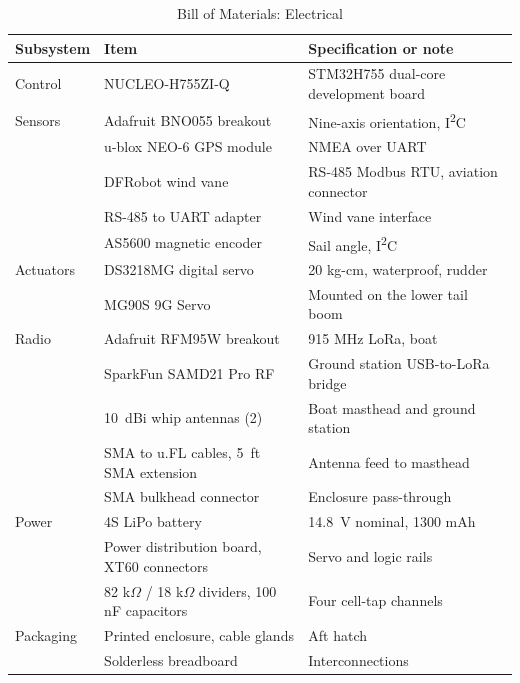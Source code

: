\begin{table}[!t]
\caption{Bill of Materials: Electrical}
\label{tab:bom_elec}
\centering
\footnotesize
\begin{tabular}{@{}p{}p{}p{}@{}}
\toprule
Subsystem & Item & Specification or note \\
\midrule
Control  & NUCLEO-H755ZI-Q & STM32H755 dual-core development board \\
Sensors  & Adafruit BNO055 breakout & Nine-axis orientation, I\textsuperscript{2}C \\
         & u-blox NEO-6 GPS module & NMEA over UART \\
         & DFRobot wind vane & RS-485 Modbus RTU, aviation connector \\
         & RS-485 to UART adapter & Wind vane interface \\
         & AS5600 magnetic encoder & Sail angle, I\textsuperscript{2}C \\
Actuators & DS3218MG digital servo & 20 kg-cm, waterproof, rudder \\
          & MG90S 9G Servo & Mounted on the lower tail boom \\
Radio    & Adafruit RFM95W breakout & 915 MHz LoRa, boat \\
         & SparkFun SAMD21 Pro RF & Ground station USB-to-LoRa bridge \\
         & \SI{10}{dBi} whip antennas (2) & Boat masthead and ground station \\
         & SMA to u.FL cables, \SI{5}{ft} SMA extension & Antenna feed to masthead \\
         & SMA bulkhead connector & Enclosure pass-through \\
Power    & 4S LiPo battery & \SI{14.8}{\volt} nominal, 1300 mAh \\
         & Power distribution board, XT60 connectors & Servo and logic rails \\
         & 82 k$\Omega$ / 18 k$\Omega$ dividers, 100 nF capacitors & Four cell-tap channels \\
Packaging & Printed enclosure, cable glands & Aft hatch \\
          & Solderless breadboard & Interconnections \\
\bottomrule
\end{tabular}
\end{table}
